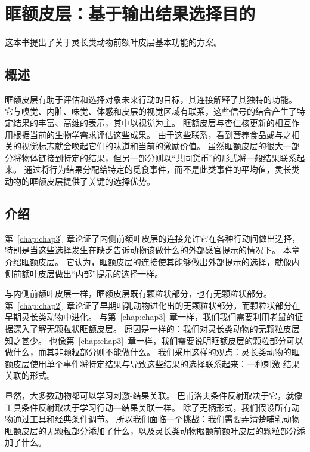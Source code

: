 \chapter{眶额皮层：基于输出结果选择目的}\label{chap:chap4}

这本书提出了关于灵长类动物前额叶皮层基本功能的方案。



\section{概述}

眶额皮层有助于评估和选择对象未来行动的目标，其连接解释了其独特的功能。
它与嗅觉、内脏、味觉、体感和皮层的视觉区域有联系，这些信号的结合产生了特定结果的丰富、高维的表示，其中以视觉为主。
眶额皮层与杏仁核更新的相互作用根据当前的生物学需求评估这些成果。
由于这些联系，看到营养食品或与之相关的视觉标志就会唤起它们的味道和当前的激励价值。
虽然眶额皮层的很大一部分将物体链接到特定的结果，但另一部分则以“共同货币”的形式将一般结果联系起来。
通过将行为结果分配给特定的觅食事件，而不是此类事件的平均值，灵长类动物的眶额皮层提供了关键的选择优势。



\section{介绍}

第~\ref{chap:chap3}~章论证了内侧前额叶皮层的连接允许它在各种行动间做出选择，特别是当这些选择发生在缺乏告诉动物该做什么的外部感官提示的情况下。
本章介绍眶额皮层。
它认为，眶额皮层的连接使其能够做出外部提示的选择，就像内侧前额叶皮层做出“内部”提示的选择一样。


与内侧前额叶皮层一样，眶额皮层既有颗粒状部分，也有无颗粒状部分。
第~\ref{chap:chap2}~章论证了早期哺乳动物进化出的无颗粒状部分，而颗粒状部分在早期灵长类动物中进化。
与第~\ref{chap:chap3}~章一样，我们我们需要利用老鼠的证据深入了解无颗粒状眶额皮层。
原因是一样的：我们对灵长类动物的无颗粒皮层知之甚少。
也像第~\ref{chap:chap3}~章一样，我们需要说明眶额皮层的颗粒部分可以做什么，而其非颗粒部分则不能做什么。
我们采用这样的观点：灵长类动物的眶额皮层使用单个事件将特定结果与导致这些结果的选择联系起来：一种刺激-结果关联的形式。\par


显然，大多数动物都可以学习刺激-结果关联。
巴甫洛夫条件反射取决于它，就像工具条件反射取决于学习行动—结果关联一样。
除了无柄形式，我们假设所有动物通过工具和经典条件调节。
所以我们面临一个挑战：我们需要弄清楚哺乳动物眶额皮层的无颗粒部分添加了什么，以及灵长类动物眼额前额叶皮层的颗粒部分添加了什么。


